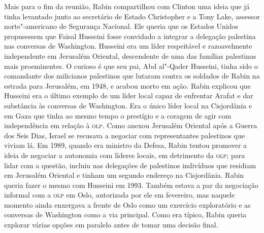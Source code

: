 Mais para o fim da reunião, Rabin compartilhou com Clinton uma ideia que
já tinha levantado junto ao secretário de Estado Christopher e a Tony
Lake, assessor norte"-americano de Segurança Nacional. Ele queria que os
Estados Unidos propusessem que Faisal Husseini fosse convidado a
integrar a delegação palestina nas conversas de Washington. Husseini era
um líder respeitável e razoavelmente independente em Jerusalém Oriental,
descendente de uma das famílias palestinas mais proeminentes. O curioso
é que seu pai, Abd al"-Qader Husseini, tinha sido o comandante dos
milicianos palestinos que lutaram contra os soldados de Rabin na estrada
para Jerusalém, em 1948, e acabou morto em ação. Rabin explicou que
Husseini era o último exemplo de um líder local capaz de enfrentar
Arafat e dar substância às conversas de Washington. Era o único líder
local na Cisjordânia e em Gaza que tinha ao mesmo tempo o prestígio e a
coragem de agir com independência em relação à \textsc{olp}. Como anexou
Jerusalém Oriental após a Guerra dos Seis Dias, Israel se recusava a
negociar com representantes palestinos que viviam lá. Em 1989, quando
era ministro da Defesa, Rabin tentou promover a ideia de negociar a
autonomia com líderes locais, em detrimento da \textsc{olp}; para lidar com a
questão, incluiu nas delegações de palestinos indivíduos que residiam em
Jerusalém Oriental e tinham um segundo endereço na Cisjordânia. Rabin
queria fazer o mesmo com Husseini em 1993. Também estava a par da
negociação informal com a \textsc{olp} em Oslo, autorizada por ele em fevereiro,
mas naquele momento ainda enxergava a frente de Oslo como um exercício
exploratório e as conversas de Washington como a via principal. Como era
típico, Rabin queria explorar várias opções em paralelo antes de tomar
uma decisão final.

